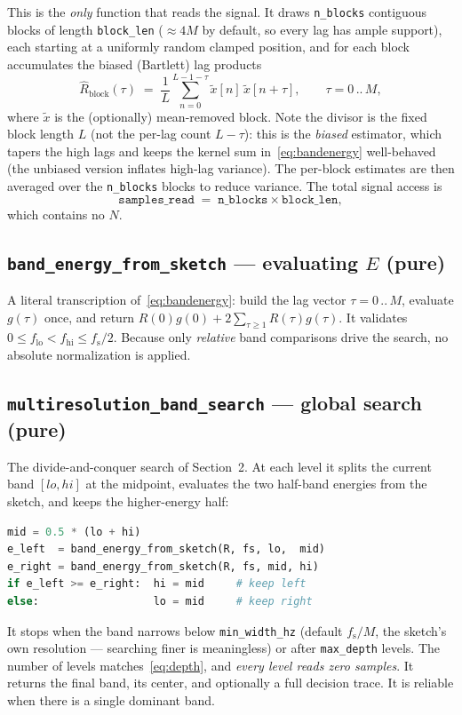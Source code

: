 \documentclass[11pt]{article}
\newcommand{\R}{R}
\newcommand{\fs}{f_{\mathrm{s}}}
\begin{document}
This is the \emph{only} function that reads the signal. It draws \texttt{n\_blocks}
contiguous blocks of length \texttt{block\_len} ($\approx 4M$ by default, so every
lag has ample support), each starting at a uniformly random clamped position, and
for each block accumulates the biased (Bartlett) lag products
\begin{equation}
  \hat\R_{\text{block}}(\tau)
    \;=\; \frac{1}{L}\sum_{n=0}^{L-1-\tau} \tilde x[n]\,\tilde x[n+\tau],
  \qquad \tau = 0\,..\,M,
  \label{eq:biasedacf}
\end{equation}
where $\tilde x$ is the (optionally) mean-removed block. Note the divisor is the
fixed block length $L$ (not the per-lag count $L-\tau$): this is the
\emph{biased} estimator, which tapers the high lags and keeps the kernel sum
in~\eqref{eq:bandenergy} well-behaved (the unbiased version inflates high-lag
variance). The per-block estimates are then averaged over the
\texttt{n\_blocks} blocks to reduce variance. The total signal access is
\begin{equation}
  \texttt{samples\_read} \;=\; \texttt{n\_blocks}\times\texttt{block\_len},
  \label{eq:samples}
\end{equation}
which contains no $N$.

\subsection{\texttt{band\_energy\_from\_sketch} --- evaluating $E$ (pure)}

A literal transcription of~\eqref{eq:bandenergy}: build the lag vector
$\tau=0\,..\,M$, evaluate $g(\tau)$ once, and return
$\R(0)g(0) + 2\sum_{\tau\ge1}\R(\tau)g(\tau)$. It validates
$0\le f_{\mathrm{lo}} < f_{\mathrm{hi}} \le \fs/2$. Because only \emph{relative}
band comparisons drive the search, no absolute normalization is applied.

\subsection{\texttt{multiresolution\_band\_search} --- global search (pure)}

The divide-and-conquer search of Section~2. At each level it splits the current
band $[lo,hi]$ at the midpoint, evaluates the two half-band energies from the
sketch, and keeps the higher-energy half:
\begin{lstlisting}[language=Python]
mid = 0.5 * (lo + hi)
e_left  = band_energy_from_sketch(R, fs, lo,  mid)
e_right = band_energy_from_sketch(R, fs, mid, hi)
if e_left >= e_right:  hi = mid     # keep left
else:                  lo = mid     # keep right
\end{lstlisting}
It stops when the band narrows below \texttt{min\_width\_hz} (default $\fs/M$, the
sketch's own resolution --- searching finer is meaningless) or after
\texttt{max\_depth} levels. The number of levels matches~\eqref{eq:depth}, and
\emph{every level reads zero samples}. It returns the final band, its center, and
optionally a full decision trace. It is reliable when there is a single dominant
band.
\end{document}
